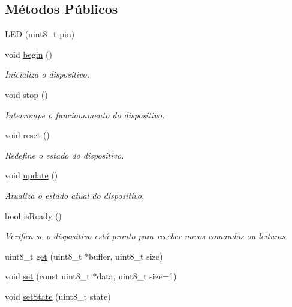 \subsection*{Métodos Públicos}
\begin{DoxyCompactItemize}
\item 
\hyperlink{classLED_a4b8692dfdef842d0da59ac0644eb0e97}{L\-E\-D} (uint8\-\_\-t pin)
\item 
void \hyperlink{classLED_a62e402841c861af9bb4eb679f5afc7d6}{begin} ()
\begin{DoxyCompactList}\small\item\em Inicializa o dispositivo. \end{DoxyCompactList}\item 
void \hyperlink{classLED_a11f7b87c240eb671482a7af687b0737c}{stop} ()
\begin{DoxyCompactList}\small\item\em Interrompe o funcionamento do dispositivo. \end{DoxyCompactList}\item 
void \hyperlink{classLED_a8b85489d7bcfc54252f28abc0a5ba3cf}{reset} ()
\begin{DoxyCompactList}\small\item\em Redefine o estado do dispositivo. \end{DoxyCompactList}\item 
void \hyperlink{classLED_ad615d612f5b0c7dac4dde5245f191382}{update} ()
\begin{DoxyCompactList}\small\item\em Atualiza o estado atual do dispositivo. \end{DoxyCompactList}\item 
bool \hyperlink{classLED_a36cc9854b853baba06ee3d1e74339c6f}{is\-Ready} ()
\begin{DoxyCompactList}\small\item\em Verifica se o dispositivo está pronto para receber novos comandos ou leituras. \end{DoxyCompactList}\item 
uint8\-\_\-t \hyperlink{classLED_a70416944b6d3cae4a8dc73859a3df2aa}{get} (uint8\-\_\-t $\ast$buffer, uint8\-\_\-t size)
\item 
void \hyperlink{classLED_aae83a677cee4ee5cb952ccbb22e57781}{set} (const uint8\-\_\-t $\ast$data, uint8\-\_\-t size=1)
\item 
void \hyperlink{classLED_a126e67dbf18aae87b9e43daed89eb837}{set\-State} (uint8\-\_\-t state)
\item 

\end{DoxyCompactItemize}
